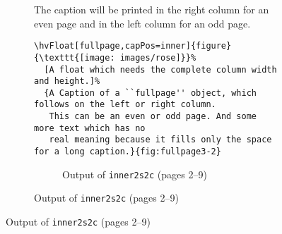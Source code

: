 \documentclass[twoside,paper=a4,usegeometry,index=totoc]{scrartcl}
\newcommand\Float[1][]{\ifx\relax#1\relax\marginnote{\fbox{float}}\else
   \marginnote{\fbox{\shortstack{float\\#1}}}\fi
}
\begin{document}
\begin{figure}[p]
\begin{figure}[p]
The caption will be printed in the right column for an even page and
in the left column for an odd page.


\begin{lstlisting}
\hvFloat[fullpage,capPos=inner]{figure}{\texttt{[image: images/rose]}}%
  [A float which needs the complete column width and height.]%
  {A Caption of a ``fullpage'' object, which follows on the left or right column. 
   This can be an even or odd page. And some more text which has no
   real meaning because it fills only the space for a long caption.}{fig:fullpage3-2}
\end{lstlisting}

\iffalse
\Float[capPos=inner]
\hvFloat[fullpage,capPos=inner]{figure}%
  {\texttt{[image: images/rose]}}%
  [A float which needs the complete column width and height.]%
  {A Caption of a ``fullpage'' object, which follows on the left or
   right column. 
   This can be an even or odd page. And some more text which has no
   real meaning because it fills only the space for a long caption.}{fig:fullpage3-2}
\fi


\begin{figure}


\hfill
{}\hfill
{}\hfill
{}

\hfill
{}\hfill
{}\hfill
{}
\caption{Output of \texttt{inner2s2c} (pages 2--9)}\label{inner2s2c}
\end{figure}



\end{figure}
\end{figure}
\end{document}
